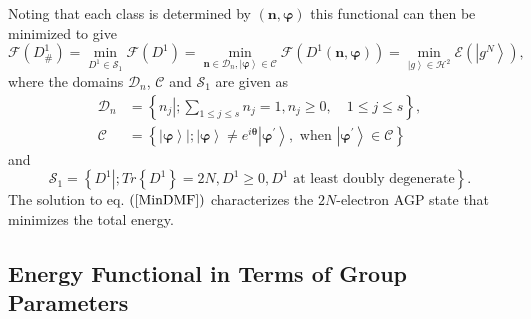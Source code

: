 \documentclass[aps,preprint]{revtex4}%
\begin{document}
Noting that each class is determined by $\left(  \mathbf{n},\mathbf{\varphi
}\right)  $ this functional can then be minimized to give
\begin{equation}
\mathcal{F}\left(  D_{\#}^{1}\right)  =\min_{D^{1}\in\mathcal{S}_{1}%
}\mathcal{F}\left(  D^{1}\right)  =\min_{\mathbf{n\in}\mathcal{D}%
_{n},\left\vert \mathbf{\varphi}\right\rangle \in\mathcal{C}}\mathcal{F}%
\left(  D^{1}\left(  \mathbf{n},\mathbf{\varphi}\right)  \right)
=\min_{\left\vert g\right\rangle \in\mathcal{H}^{2}}\mathcal{E}\left(
\left\vert g^{N}\right\rangle \right)  , \label{MinDMF}%
\end{equation}
where the domains $\mathcal{D}_{n}$, $\mathcal{C}$ and $\mathcal{S}_{1}$ are
given as%
\begin{align}
\mathcal{D}_{n}  &  =\left\{  \left.  n_{j}\right\vert ;\sum_{1\leq j\leq
s}n_{j}=1,n_{j}\geq0,\quad1\leq j\leq s\right\}  ,\\
\mathcal{C}  &  =\left\{  \left.  \left\vert \mathbf{\varphi}\right\rangle
\right\vert ;\left\vert \mathbf{\varphi}\right\rangle \neq e^{i\mathbf{\theta
}}\left\vert \mathbf{\varphi}^{\prime}\right\rangle ,\text{ when }\left\vert
\mathbf{\varphi}^{\prime}\right\rangle \in\mathcal{C}\right\}
\end{align}
and
\begin{equation}
\mathcal{S}_{1}=\left\{  \left.  D^{1}\right\vert ;Tr\left\{  D^{1}\right\}
=2N,D^{1}\geq0,D^{1}\text{ at least doubly degenerate}\right\}  .
\end{equation}
The solution to eq. $\left(  \ref{MinDMF}\right)  $ characterizes the
$2N$-electron AGP state that minimizes the total energy.

\subsection{Energy Functional in Terms of Group Parameters\label{Group_Param}}
\end{document}
